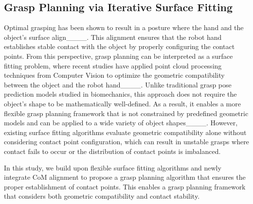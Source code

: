     \subsection{Grasp Planning via Iterative Surface Fitting}
        Optimal grasping has been shown to result in a posture where the hand and the object's surface align____.
        This alignment ensures that the robot hand establishes stable contact with the object by properly configuring the contact points.
        From this perspective, grasp planning can be interpreted as a surface fitting problem, where recent studies have applied point cloud processing techniques from Computer Vision to optimize the geometric compatibility between the object and the robot hand____. 
        Unlike traditional grasp pose prediction models studied in biomechanics, this approach does not require the object's shape to be mathematically well-defined.
        As a result, it enables a more flexible grasp planning framework that is not constrained by predefined geometric models and can be applied to a wide variety of object shapes____.
        However, existing surface fitting algorithms evaluate geometric compatibility alone without considering contact point configuration, which can result in unstable grasps where contact fails to occur or the distribution of contact points is imbalanced.
        
        In this study, we build upon flexible surface fitting algorithms and newly integrate CoM alignment to propose a grasp planning algorithm that ensures the proper establishment of contact points.
        This enables a grasp planning framework that considers both geometric compatibility and contact stability.





